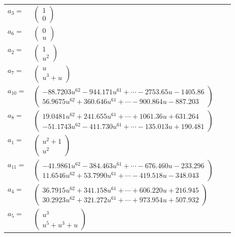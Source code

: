 \documentclass[1p]{elsarticle_modified}
\theoremstyle{definition}
\begin{document}
\begin{tabular}{m{7pt} m{180pt} m{7pt} m{180pt} }
\flushright $a_{3}=$&$\begin{pmatrix}1\\0\end{pmatrix}$ \\
\flushright $a_{6}=$&$\begin{pmatrix}0\\u\end{pmatrix}$ \\
\flushright $a_{2}=$&$\begin{pmatrix}1\\u^2\end{pmatrix}$ \\
\flushright $a_{7}=$&$\begin{pmatrix}u\\u^3+u\end{pmatrix}$ \\
\flushright $a_{10}=$&$\begin{pmatrix}-88.7203 u^{62}-944.171 u^{61}+\cdots-2753.65 u-1405.86\\56.9675 u^{62}+360.646 u^{61}+\cdots-900.864 u-887.203\end{pmatrix}$ \\
\flushright $a_{8}=$&$\begin{pmatrix}19.0481 u^{62}+241.655 u^{61}+\cdots+1061.36 u+631.264\\-51.1743 u^{62}-411.730 u^{61}+\cdots-135.013 u+190.481\end{pmatrix}$ \\
\flushright $a_{1}=$&$\begin{pmatrix}u^2+1\\u^2\end{pmatrix}$ \\
\flushright $a_{11}=$&$\begin{pmatrix}-41.9861 u^{62}-384.463 u^{61}+\cdots-676.460 u-233.296\\11.6546 u^{62}+53.7990 u^{61}+\cdots-419.518 u-348.043\end{pmatrix}$ \\
\flushright $a_{4}=$&$\begin{pmatrix}36.7915 u^{62}+341.158 u^{61}+\cdots+606.220 u+216.945\\30.2923 u^{62}+321.272 u^{61}+\cdots+973.954 u+507.932\end{pmatrix}$ \\
\flushright $a_{5}=$&$\begin{pmatrix}u^3\\u^5+u^3+u\end{pmatrix}$ \\

\end{tabular}
\end{document}
